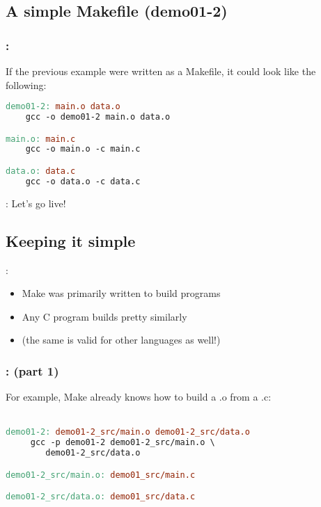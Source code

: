 \subsection{A simple Makefile (demo01-2)}
\begin{frame}[fragile]
    \frametitle{\secname: \small\subsecname\normalsize}

    If the previous example were written as a Makefile, it could look like the following:

    \small \begin{lstlisting}[language=make]
demo01-2: main.o data.o
    gcc -o demo01-2 main.o data.o

main.o: main.c
    gcc -o main.o -c main.c

data.o: data.c
    gcc -o data.o -c data.c
    \end{lstlisting} \normalsize
\end{frame}

\begin{frame}{\secname: \small\subsecname\normalsize}
    Let's go live!

\end{frame}

\subsection{Keeping it simple}
\begin{frame}{\secname: \small\subsecname\normalsize}
    \begin{itemize}
        \item Make was primarily written to build programs
        \item Any C program builds pretty similarly
        \item (the same is valid for other languages as well!)
    \end{itemize}
\end{frame}

\begin{frame}[fragile]
    \frametitle{\secname: \small\subsecname (part 1)\normalsize}

    For example, Make already knows how to build a .o from a .c: \\~\\

    \small \begin{lstlisting}[language=make]
demo01-2: demo01-2_src/main.o demo01-2_src/data.o
     gcc -p demo01-2 demo01-2_src/main.o \
        demo01-2_src/data.o

demo01-2_src/main.o: demo01_src/main.c

demo01-2_src/data.o: demo01_src/data.c
    \end{lstlisting} \normalsize
\end{frame}

